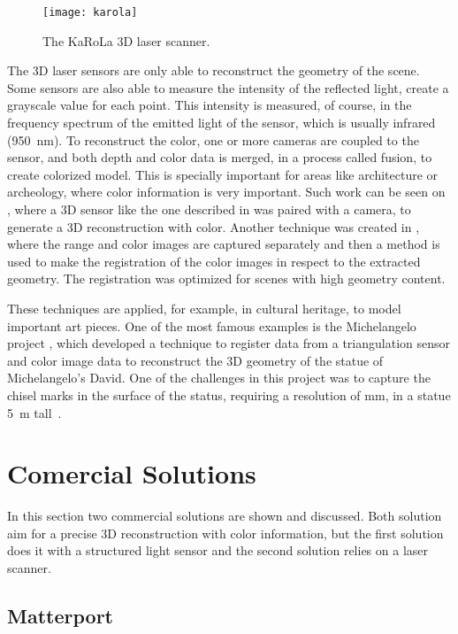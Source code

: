 \begin{figure}[h]
    \centering
    \texttt{[image: karola]}
    \caption{The KaRoLa 3D laser scanner.}
    \label{fig:karola}
\end{figure}

The 3D laser sensors are only able to reconstruct the geometry of the scene. Some sensors are also able to measure the intensity of the reflected light, create a grayscale value for each point. This intensity is measured, of course, in the frequency spectrum of the emitted light of the sensor, which is usually infrared (\SI{950}{\nano\meter}). To reconstruct the color, one or more cameras are coupled to the sensor, and both depth and color data is merged, in a process called fusion, to create colorized model. This is specially important for areas like architecture or archeology, where color information is very important. Such work can be seen on \cite{pdias2006}, where a 3D sensor like the one described in \cite{surmann2003} was paired with a camera, to generate a 3D reconstruction with color. Another technique was created in \cite{stamus2000}, where the range and color images are captured separately and then a method is used to make the registration of the color images in respect to the extracted geometry. The registration was optimized for scenes with high geometry content.

These techniques are applied, for example, in cultural heritage, to model important art pieces. One of the most famous examples is the Michelangelo project \cite{levoy2000}, which developed a technique to register data from a triangulation sensor and color image data to reconstruct the 3D geometry of the statue of Michelangelo's David. One of the challenges in this project was to capture the chisel marks in the surface of the status, requiring a resolution of  \si{\milli\meter}, in a statue \SI{5}{\meter} tall~\cite{levoy2000}.

\section{Comercial Solutions}

In this section two commercial solutions are shown and discussed. Both solution aim for a precise 3D reconstruction with color information, but the first solution does it with a structured light sensor and the second solution relies on a laser scanner. 

\subsection{Matterport}

